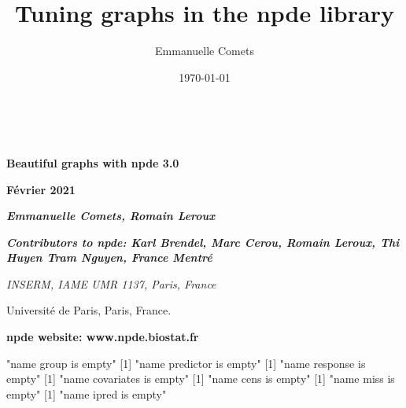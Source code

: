 \documentclass{article}
\title{Tuning graphs in the npde library}
\author{Emmanuelle Comets}
\date{\today}
\begin{document}
\thispagestyle{empty}



\pagestyle{fancy}
\renewcommand{\headrulewidth}{0pt}
\renewcommand{\footrulewidth}{1pt}
\lhead{}
\chead{}
\rhead{}
\rfoot{\thepage}

\renewenvironment{Schunk}{\vspace{\topsep}}{\vspace{\topsep}}


\parindent 18pt
$\phantom{minime}$

\vskip 3cm
\begin{center}
{\setlength{\baselineskip}{2\baselineskip}
{\Large \bfseries Beautiful graphs with npde 3.0}

{\Large \bfseries F\'evrier 2021}

\bigskip 

{\Large \itshape \bfseries Emmanuelle Comets, Romain Leroux}

\bigskip 

\bigskip 

{\large \itshape \bfseries Contributors to npde: Karl Brendel, Marc Cerou, Romain Leroux, Thi Huyen Tram Nguyen, France Mentr\'e}

\bigskip
{\it
INSERM, IAME UMR 1137, Paris, France

Universit\'e de Paris, Paris, France.
}
\par}
\end{center}

\vskip 8cm
\begin{center}
{\large \bfseries npde website: www.npde.biostat.fr}
\end{center}

\newpage

\begin{Schunk}
\begin{Soutput}
[1] "name group is empty"
[1] "name predictor is empty"
[1] "name response is empty"
[1] "name covariates is empty"
[1] "name cens is empty"
[1] "name miss is empty"
[1] "name ipred is empty"
\end{Soutput}
\end{Schunk}
\end{document}

